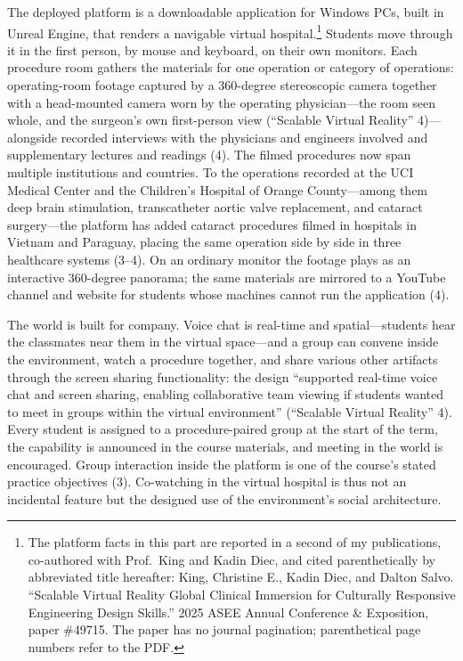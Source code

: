 The deployed platform is a downloadable application for Windows PCs, built in
Unreal Engine, that renders a navigable virtual hospital.\footnote{The platform
facts in this part are reported in a second of my publications, co-authored
with Prof.\ King and Kadin Diec, and cited parenthetically by abbreviated title
hereafter: King, Christine E., Kadin Diec, and Dalton Salvo. ``Scalable Virtual
Reality Global Clinical Immersion for Culturally Responsive Engineering Design
Skills.'' 2025 ASEE Annual Conference \& Exposition, paper \#49715.
The paper has no journal pagination; parenthetical page numbers refer to the
PDF.} Students move through it in the first person, by mouse and keyboard, on
their own monitors. Each procedure room gathers the materials for one
operation or category of operations: operating-room footage captured by a 360-degree stereoscopic camera
together with a head-mounted camera worn by the operating physician---the room
seen whole, and the surgeon's own first-person view (``Scalable Virtual
Reality'' 4)---alongside recorded interviews with the physicians and engineers
involved and supplementary lectures and readings (4). The filmed procedures now
span multiple institutions and countries. To the operations recorded at the UCI Medical
Center and the Children's Hospital of Orange County---among them deep brain
stimulation, transcatheter aortic valve replacement, and cataract surgery---the
platform has added cataract procedures filmed in hospitals in Vietnam and
Paraguay, placing the same operation side by side in three healthcare systems
(3--4). On an ordinary monitor the footage plays as an interactive 360-degree
panorama; the same materials are mirrored to a YouTube channel and website for
students whose machines cannot run the application (4).

The world is built for company. Voice chat is real-time and spatial---students
hear the classmates near them in the virtual space---and a group can convene
inside the environment, watch a procedure together, and share various other
artifacts through the screen sharing functionality: the design ``supported
real-time voice chat and screen sharing, enabling collaborative team viewing if
students wanted to meet in groups within the virtual environment'' (``Scalable
Virtual Reality'' 4). Every
student is assigned to a procedure-paired group at the start of the term, the
capability is announced in the course materials, and meeting in the world is
encouraged. Group interaction inside the platform is one of the course's stated
practice objectives (3). Co-watching in the virtual hospital is thus not an
incidental feature but the designed use of the environment's social
architecture.

